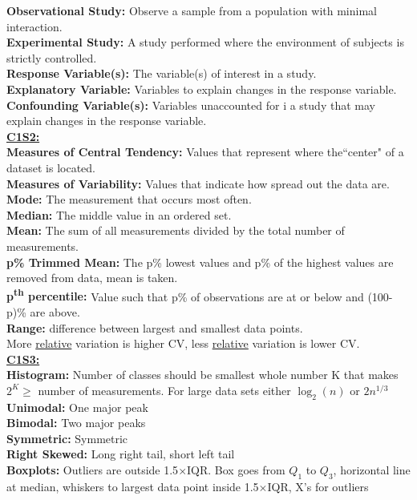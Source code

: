 \documentclass[letter, 12pt]{article}
\begin{document}
\begin{multicols}{2}
\textbf{Observational Study:} Observe a sample from a population with minimal interaction.\\
\textbf{Experimental Study:} A study performed where the environment of subjects is strictly controlled.\\
\textbf{Response Variable(s):} The variable(s) of interest in a study.\\
\textbf{Explanatory Variable:} Variables to explain changes in the response variable.\\
\textbf{Confounding Variable(s):} Variables unaccounted for i a study that may explain changes in the response variable.\\
\textbf{\uline{C1S2:}}\\
\textbf{Measures of Central Tendency:} Values that represent where the``center" of a dataset is located.\\
\textbf{Measures of Variability:} Values that indicate how spread out the data are.\\
\textbf{Mode:} The measurement that occurs most often.\\
\textbf{Median:} The middle value in an ordered set.\\
\textbf{Mean:} The sum of all measurements divided by the total number of measurements.\\
\textbf{p\% Trimmed Mean:} The p\% lowest values and p\% of the highest values are removed from data, mean is taken.\\
\textbf{p\textsuperscript{th} percentile:} Value such that p\% of observations are at or below and (100-p)\% are above.\\
\textbf{Range:} difference between largest and smallest data points.\\
More \uline{relative} variation is higher CV, less \uline{relative} variation is lower CV.\\
\textbf{\uline{C1S3:}}\\
\textbf{Histogram:} Number of classes should be smallest whole number K that makes $2^K \geq$ number of measurements. For large data sets either $\log_2(n)$ or $2n^{1/3}$\\
\textbf{Unimodal:} One major peak\\
\textbf{Bimodal:} Two major peaks\\
\textbf{Symmetric:} Symmetric\\
\textbf{Right Skewed:} Long right tail, short left tail\\
\textbf{Boxplots:} Outliers are outside 1.5$\times$IQR. Box goes from $Q_1$ to $Q_3$, horizontal line at median, whiskers to largest data point inside 1.5$\times$IQR, X's for outliers\\

\end{multicols}
\end{document}
